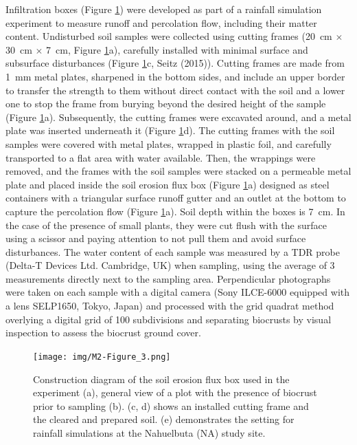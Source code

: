 Infiltration boxes (Figure \ref{fig:M2-F3}) were developed as part of a rainfall simulation experiment to measure runoff and percolation flow, including their matter content. Undisturbed soil samples were collected using cutting frames (\SI{20}{\centi\metre} $\times$ \SI{30}{\centi\metre} $\times$ \SI{7}{\centi\metre}, Figure \ref{fig:M2-F3}a), carefully installed with minimal surface and subsurface disturbances (Figure \ref{fig:M2-F3}c, Seitz (2015)). Cutting frames are made from \SI{1}{\milli\meter} metal plates, sharpened in the bottom sides, and include an upper border to transfer the strength to them without direct contact with the soil and a lower one to stop the frame from burying beyond the desired height of the sample (Figure \ref{fig:M2-F3}a). Subsequently, the cutting frames were excavated around, and a metal plate was inserted underneath it (Figure \ref{fig:M2-F3}d). The cutting frames with the soil samples were covered with metal plates, wrapped in plastic foil, and carefully transported to a flat area with water available. Then, the wrappings were removed, and the frames with the soil samples were stacked on a permeable metal plate and placed inside the soil erosion flux box (Figure \ref{fig:M2-F3}a) designed as steel containers with a triangular surface runoff gutter and an outlet at the bottom to capture the percolation flow (Figure \ref{fig:M2-F3}a). Soil depth within the boxes is \SI{7}{\centi\meter}. In the case of the presence of small plants, they were cut flush with the surface using a scissor and paying attention to not pull them and avoid surface disturbances. The water content of each sample was measured by a TDR probe (Delta-T Devices Ltd. Cambridge, UK) when sampling, using the average of 3 measurements directly next to the sampling area. Perpendicular photographs were taken on each sample with a digital camera (Sony ILCE-6000 equipped with a lens SELP1650, Tokyo, Japan) and processed with the grid quadrat method overlying a digital grid of 100 subdivisions and separating biocrusts by visual inspection \citep{Belnap2001} to assess the biocrust ground cover.

\begin{figure}[H]
	\centering
	\texttt{[image: img/M2-Figure\_3.png]}
	\caption[Field experimental setup for soil erosion and rainfall simulation: construction of the flux box, plot preparation, and biocrust evaluation at Nahuelbuta (NA)]{Construction diagram of the soil erosion flux box used in the experiment (a), general view of a plot with the presence of biocrust prior to sampling (b). (c, d) shows an installed cutting frame and the cleared and prepared soil. (e) demonstrates the setting for rainfall simulations at the Nahuelbuta (NA) study site.}
	\label{fig:M2-F3}
\end{figure}

